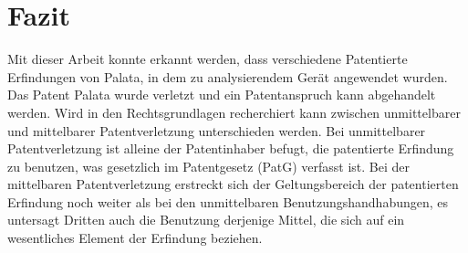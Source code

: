 \section{Fazit}\label{sec:Fazit}
Mit dieser Arbeit konnte erkannt werden, dass verschiedene Patentierte Erfindungen von Palata, in dem zu analysierendem Gerät angewendet wurden. Das Patent Palata wurde verletzt und ein Patentanspruch kann abgehandelt werden. Wird in den Rechtsgrundlagen recherchiert kann zwischen unmittelbarer und mittelbarer Patentverletzung unterschieden werden. Bei unmittelbarer Patentverletzung ist alleine der Patentinhaber befugt, die patentierte Erfindung zu benutzen, was gesetzlich im Patentgesetz (PatG) verfasst ist. Bei der mittelbaren Patentverletzung erstreckt sich der Geltungsbereich der patentierten Erfindung noch weiter als bei den unmittelbaren Benutzungshandhabungen, es untersagt Dritten auch die Benutzung derjenige Mittel, die sich auf ein wesentliches Element der Erfindung beziehen.